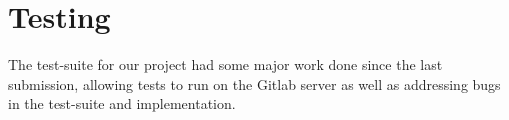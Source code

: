 \section{Testing}
The test-suite for our project had some major work done since the last submission, allowing tests to run on the Gitlab server as well as addressing bugs in the test-suite and implementation. 
